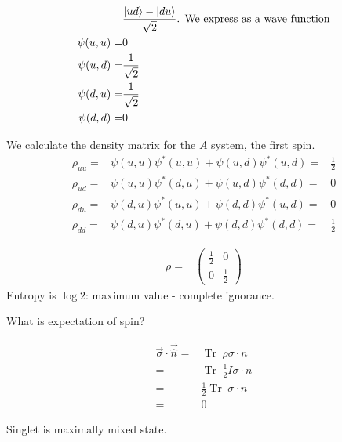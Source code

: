 \documentclass[]{article}
\DeclareMathOperator{\Tr}{Tr \;}
\begin{document}
\begin{align*}
	&\frac{\ket{ud}-\ket{du}}{\sqrt{2}} \text{. We express as a wave function}\\
	\psi(u,u) =& 0\\
	\psi(u,d) =& \frac{1}{\sqrt{2}}\\
	\psi(d,u) =& \frac{1}{\sqrt{2}}\\
	\psi(d,d) =& 0
\end{align*}

We calculate the density matrix for the $A$ system, the first spin.
\begin{align*}
	\rho_{uu} =& \psi(u,u)\psi^*(u,u) +  \psi(u,d)\psi^*(u,d) =& \frac{1}{2}\\
	\rho_{ud} =& \psi(u,u)\psi^*(d,u) +  \psi(u,d)\psi^*(d,d) =& 0\\
	\rho_{du} =& \psi(d,u)\psi^*(u,u) +  \psi(d,d)\psi^*(u,d) =& 0\\
	\rho_{dd} =& \psi(d,u)\psi^*(d,u) +  \psi(d,d)\psi^*(d,d) =& \frac{1}{2}
\end{align*}

\begin{align*}
	\rho =& \begin{pmatrix}
		\frac{1} {2}&0\\
		0 &\frac{1}{2}
	\end{pmatrix}
\end{align*}
Entropy is $\log{2}$: maximum value - complete ignorance.

What is expectation of spin?

\begin{align*}
	\vec{\sigma} \cdot \vec{\hat{n}} =& \Tr \rho \sigma \cdot n\\
	=& \Tr \frac{1}{2} I \sigma \cdot n\\
	=& \frac{1}{2} \Tr\sigma \cdot n\\
	=& 0
\end{align*}

Singlet is maximally mixed state.
\end{document}
